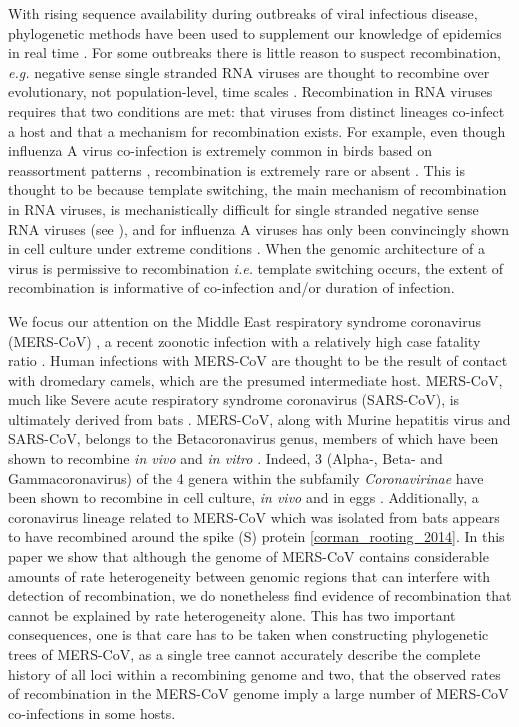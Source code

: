 \documentclass[11pt,oneside,letterpaper]{article}
\begin{document}
With rising sequence availability during outbreaks of viral infectious disease, phylogenetic methods have been used to supplement our knowledge of epidemics in real time \citep{smith_2009,rambaut_2009,lemey_2009,drosten_2013,cotten_2013,cotten_2014,drosten_2014,gire_2014}.
For some outbreaks there is little reason to suspect recombination, \textit{e.g.} negative sense single stranded RNA viruses are thought to recombine over evolutionary, not population-level, time scales \citep{chare_2003}.
Recombination in RNA viruses requires that two conditions are met: that viruses from distinct lineages co-infect a host and that a mechanism for recombination exists.
For example, even though influenza A virus co-infection is extremely common in birds based on reassortment patterns \citep{li_2004,dong_2011,lu_2014}, recombination is extremely rare or absent \citep{chare_2003,boni_2008}.
This is thought to be because template switching, the main mechanism of recombination in RNA viruses, is mechanistically difficult for single stranded negative sense RNA viruses (see \cite{chare_2003}), and for influenza A viruses has only been convincingly shown in cell culture under extreme conditions \citep{mitnaul_2000}.
When the genomic architecture of a virus is permissive to recombination \textit{i.e.} template switching occurs, the extent of recombination is informative of co-infection and/or duration of infection.

We focus our attention on the Middle East respiratory syndrome coronavirus (MERS-CoV) \citep{zaki_2012}, a recent zoonotic infection with a relatively high case fatality ratio \citep{cauchemez_2014,memish_2013,assiri_2013}.
Human infections with MERS-CoV are thought to be the result of contact with dromedary camels, which are the presumed intermediate host.
MERS-CoV, much like Severe acute respiratory syndrome coronavirus (SARS-CoV), is ultimately derived from bats \citep{corman_rooting_2014}.
MERS-CoV, along with Murine hepatitis virus and SARS-CoV, belongs to the Betacoronavirus genus, members of which have been shown to recombine \textit{in vivo} \citep{keck_1988} and \textit{in vitro} \citep{lai_1985,makino_1986}.
Indeed, 3 (Alpha-, Beta- and Gammacoronavirus) of the 4 genera within the subfamily \textit{Coronavirinae} have been shown to recombine in cell culture, \textit{in vivo} and in eggs \citep{lai_1985,makino_1986,keck_1988,kottier_1995,herrewegh_1998}.
Additionally, a coronavirus lineage related to MERS-CoV which was isolated from bats appears to have recombined around the spike (S) protein \ref{corman_rooting_2014}.
In this paper we show that although the genome of MERS-CoV contains considerable amounts of rate heterogeneity between genomic regions that can interfere with detection of recombination, we do nonetheless find evidence of recombination that cannot be explained by rate heterogeneity alone.
This has two important consequences, one is that care has to be taken when constructing phylogenetic trees of MERS-CoV, as a single tree cannot accurately describe the complete history of all loci within a recombining genome and two, that the observed rates of recombination in the MERS-CoV genome imply a large number of MERS-CoV co-infections in some hosts.
\end{document}
